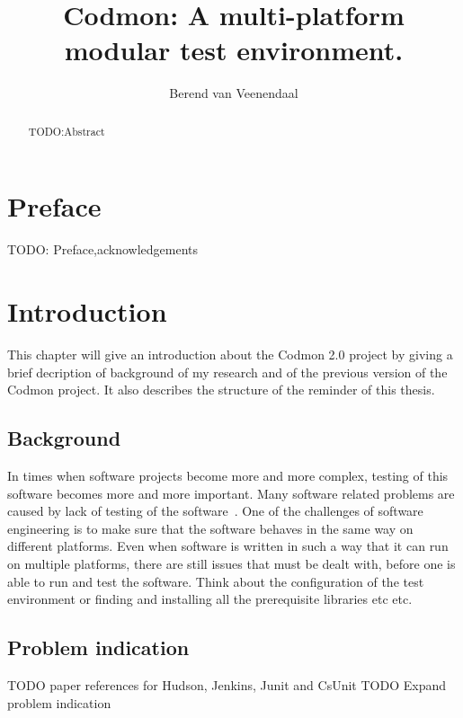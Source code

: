 \documentclass[a4paper,10pt]{scrartcl}
\title{Codmon: A multi-platform modular test environment.}
\author{Berend van Veenendaal}
\newcommand{\project}{Codmon 2.0}
\begin{document}
\maketitle

\begin{abstract}
TODO:Abstract
\end{abstract}
\newpage
\section*{Preface}
\label{sec:Preface}
TODO: Preface,acknowledgements
\newpage
\tableofcontents
\newpage

\section{Introduction}
\label{sec:Introduction}
This chapter will give an introduction about the \project{} project by giving a brief decription of background of my research and of the
previous version of the Codmon project. It also describes the structure of the reminder of this thesis.

\subsection{Background}
\label{sec:Background}
In times when software projects become more and more complex, testing of this software becomes more and more important. Many software
related problems are caused by lack of testing of the software~\cite{TTCST}. One of the challenges of software engineering is to make
sure that the software behaves in the same way on different platforms. Even when software is written in such a way that it can run on multiple platforms, there 
are still issues that must be dealt with, before one is able to run and test the software. Think about the configuration of the test environment 
or finding and installing all the prerequisite libraries etc etc. 

\subsection{Problem indication}
\label{subsec:Problemindication}
TODO paper references for Hudson, Jenkins, Junit and CsUnit 
TODO Expand problem indication
\end{document}
